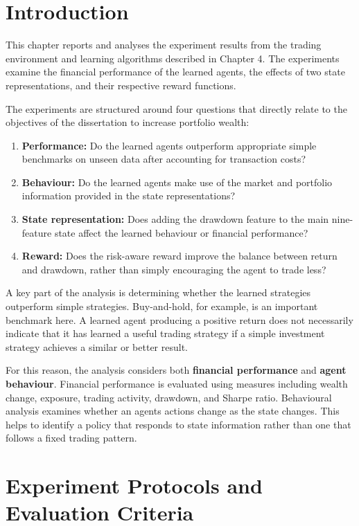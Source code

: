 \section{Introduction}

This chapter reports and analyses the experiment results from the
trading environment and learning algorithms described in Chapter 4. The
experiments examine the financial performance of the learned agents, the
effects of two state representations, and their respective reward
functions.

The experiments are structured around four questions that directly
relate to the objectives of the dissertation to increase portfolio
wealth:

\begin{enumerate}
\def\labelenumi{\arabic{enumi}.}
\item
  \textbf{Performance:} Do the learned agents outperform appropriate
  simple benchmarks on unseen data after accounting for transaction
  costs?
\item
  \textbf{Behaviour:} Do the learned agents make use of the market and
  portfolio information provided in the state representations?
\item
  \textbf{State representation:} Does adding the drawdown feature to the
  main nine-feature state affect the learned behaviour or financial
  performance?
\item
  \textbf{Reward:} Does the risk-aware reward improve the balance
  between return and drawdown, rather than simply encouraging the agent
  to trade less?
\end{enumerate}

A key part of the analysis is determining whether the learned strategies
outperform simple strategies. Buy-and-hold, for example, is an important
benchmark here. A learned agent producing a positive return does not
necessarily indicate that it has learned a useful trading strategy if a
simple investment strategy achieves a similar or better result.

For this reason, the analysis considers both \textbf{financial
performance} and \textbf{agent behaviour}. Financial performance is
evaluated using measures including wealth change, exposure, trading
activity, drawdown, and Sharpe ratio. Behavioural analysis examines
whether an agent\textquotesingle s actions change as the state changes.
This helps to identify a policy that responds to state information
rather than one that follows a fixed trading pattern.

\section{Experiment Protocols and Evaluation Criteria}

